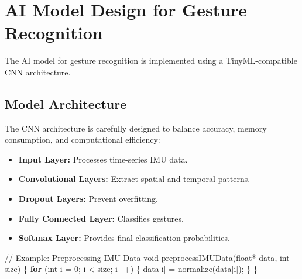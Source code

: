 \documentclass[
  9pt,
  letterpaper,
  abstract,
  titlepage]{scrbook}
\newenvironment{Shaded}{\begin{snugshade}}{\end{snugshade}}
\newcommand{\CommentTok}[1]{\textcolor[rgb]{0.37,0.37,0.37}{#1}}
\newcommand{\ControlFlowTok}[1]{\textcolor[rgb]{0.00,0.23,0.31}{\textbf{#1}}}
\newcommand{\DataTypeTok}[1]{\textcolor[rgb]{0.68,0.00,0.00}{#1}}
\newcommand{\DecValTok}[1]{\textcolor[rgb]{0.68,0.00,0.00}{#1}}
\newcommand{\NormalTok}[1]{\textcolor[rgb]{0.00,0.23,0.31}{#1}}
\newcommand{\OperatorTok}[1]{\textcolor[rgb]{0.37,0.37,0.37}{#1}}
\begin{document}
\section{AI Model Design for Gesture
Recognition}\label{ai-model-design-for-gesture-recognition}

The AI model for gesture recognition is implemented using a
TinyML-compatible CNN architecture.

\subsection{Model Architecture}\label{model-architecture}

The CNN architecture is carefully designed to balance accuracy, memory
consumption, and computational efficiency:

\begin{itemize}
\item
  \textbf{Input Layer:} Processes time-series IMU data.
\item
  \textbf{Convolutional Layers:} Extract spatial and temporal patterns.
\item
  \textbf{Dropout Layers:} Prevent overfitting.
\item
  \textbf{Fully Connected Layer:} Classifies gestures.
\item
  \textbf{Softmax Layer:} Provides final classification probabilities.
\end{itemize}

\begin{Shaded}
\begin{Highlighting}[]
\CommentTok{// Example: Preprocessing IMU Data}
\DataTypeTok{void}\NormalTok{ preprocessIMUData}\OperatorTok{(}\DataTypeTok{float}\OperatorTok{*}\NormalTok{ data}\OperatorTok{,} \DataTypeTok{int}\NormalTok{ size}\OperatorTok{)} \OperatorTok{\{}
    \ControlFlowTok{for} \OperatorTok{(}\DataTypeTok{int}\NormalTok{ i }\OperatorTok{=} \DecValTok{0}\OperatorTok{;}\NormalTok{ i }\OperatorTok{\textless{}}\NormalTok{ size}\OperatorTok{;}\NormalTok{ i}\OperatorTok{++)} \OperatorTok{\{}
\NormalTok{        data}\OperatorTok{[}\NormalTok{i}\OperatorTok{]} \OperatorTok{=}\NormalTok{ normalize}\OperatorTok{(}\NormalTok{data}\OperatorTok{[}\NormalTok{i}\OperatorTok{]);}
    \OperatorTok{\}}
\OperatorTok{\}}
\end{Highlighting}
\end{Shaded}
\end{document}
